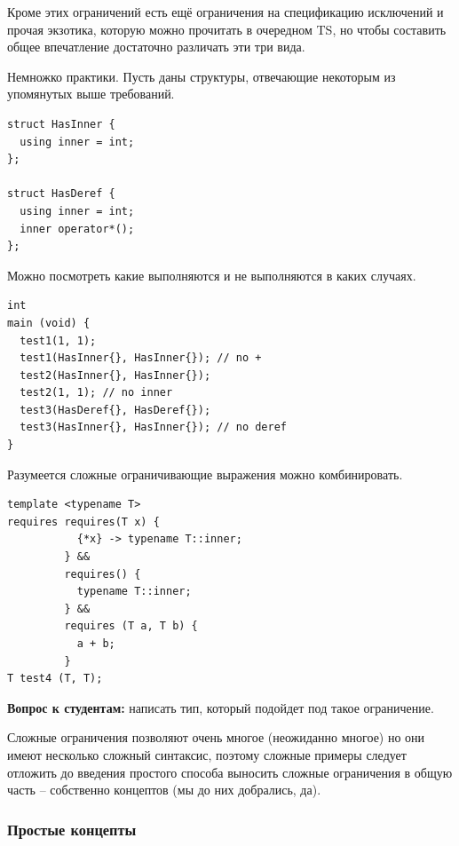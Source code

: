 \documentclass[a4paper,12pt,oneside]{article}
\newif\ifanswers
\begin{document}
Кроме этих ограничений есть ещё ограничения на спецификацию исключений и прочая экзотика, которую можно прочитать в очередном TS, но чтобы составить общее впечатление достаточно различать эти три вида.

Немножко практики. Пусть даны структуры, отвечающие некоторым из упомянутых выше требований.

\begin{lstlisting}
struct HasInner {
  using inner = int;
};

struct HasDeref {
  using inner = int;
  inner operator*();
};
\end{lstlisting}

Можно посмотреть какие выполняются и не выполняются в каких случаях.

\begin{lstlisting}
int
main (void) {
  test1(1, 1);
  test1(HasInner{}, HasInner{}); // no +
  test2(HasInner{}, HasInner{});
  test2(1, 1); // no inner
  test3(HasDeref{}, HasDeref{});
  test3(HasInner{}, HasInner{}); // no deref
}
\end{lstlisting}

Разумеется сложные ограничивающие выражения можно комбинировать.

\begin{lstlisting}
template <typename T>
requires requires(T x) {
           {*x} -> typename T::inner;
         } &&
         requires() {
           typename T::inner;
         } &&
         requires (T a, T b) {
           a + b;
         }
T test4 (T, T);
\end{lstlisting}

\textbf{Вопрос к студентам:} написать тип, который подойдет под такое ограничение.

\ifanswers
Вариант ответа:
\begin{lstlisting}
struct HasPlus {
  using inner = int;
  inner operator*();
  void operator+(HasPlus x);
};
\end{lstlisting}
\fi

Сложные ограничения позволяют очень многое (неожиданно многое) но они имеют несколько сложный синтаксис, поэтому сложные примеры следует отложить до введения простого способа выносить сложные ограничения в общую часть -- собственно концептов (мы до них добрались, да).

\subsubsection{Простые концепты}
\end{document}
